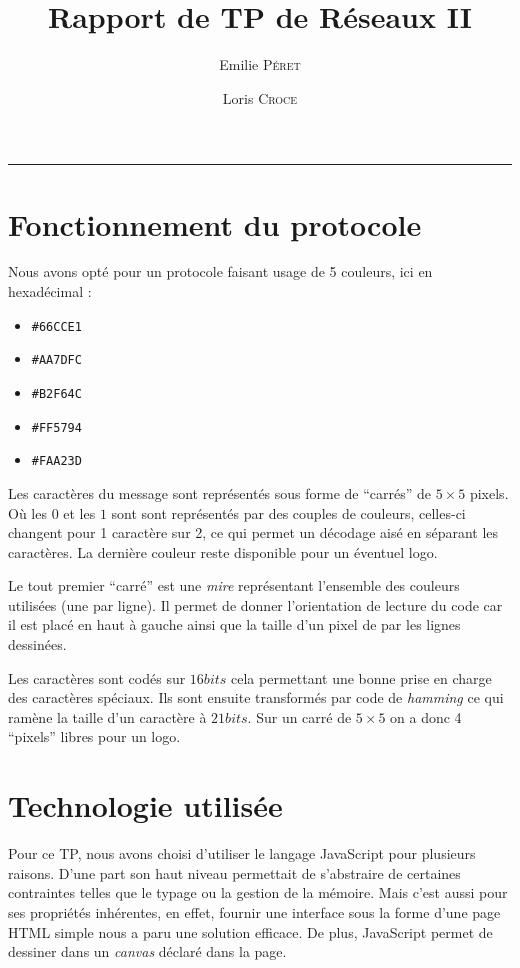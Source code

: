 \documentclass[12pt, a4paper]{article}
\date{}
\title{Rapport de TP de Réseaux II}
\author{Emilie \textsc{Péret} \and Loris \textsc{Croce}}
\begin{document}
\maketitle

\hrule


\section*{Fonctionnement du protocole}

Nous avons opté pour un protocole faisant usage de 5 couleurs, ici en hexadécimal :
\begin{itemize}
	\item \verb|#66CCE1| 
	\item \verb|#AA7DFC| 
	\item \verb|#B2F64C| 
	\item \verb|#FF5794| 
	\item \verb|#FAA23D|
\end{itemize}

Les caractères du message sont représentés sous forme de ``carrés'' de $5\times5$ pixels. Où les $0$ et les $1$ sont sont représentés par des couples de couleurs, celles-ci changent pour 1 caractère sur 2, ce qui permet un décodage aisé en séparant les caractères. La dernière couleur reste disponible pour un éventuel logo. 

Le tout premier ``carré'' est une \emph{mire} représentant l'ensemble des couleurs utilisées (une par ligne). Il permet de donner l'orientation de lecture du code car il est placé en haut à gauche ainsi que la taille d'un pixel de par les lignes dessinées.

Les caractères sont codés sur $16bits$ cela permettant une bonne prise en charge des caractères spéciaux. Ils sont ensuite transformés par code de \emph{hamming} ce qui ramène la taille d'un caractère à $21bits$. Sur un carré de $5\times5$ on a donc 4 ``pixels'' libres pour un logo.  

\section*{Technologie utilisée}

Pour ce TP, nous avons choisi d'utiliser le langage \textsf{JavaScript} pour plusieurs raisons. D'une part son haut niveau permettait de s'abstraire de certaines contraintes telles que le typage ou la gestion de la mémoire. Mais c'est aussi pour ses propriétés inhérentes, en effet, fournir une interface sous la forme d'une page HTML simple nous a paru une solution efficace. De plus, \textsf{JavaScript} permet de dessiner dans un \emph{canvas} déclaré dans la page.
\end{document}
